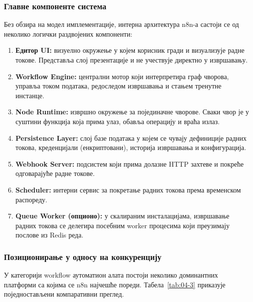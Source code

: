 \subsubsection{Главне компоненте система}

Без обзира на модел имплементације, интерна архитектура n8n-а
састоји се од неколико логички раздвојених компоненти:

\begin{enumerate}
    \item \textbf{Едитор UI:} визуелно окружење у којем корисник
    гради и визуализује радне токове. Представља слој презентације
    и не учествује директно у извршавању.
    \item \textbf{Workflow Engine:} централни мотор који интерпретира
    граф чворова, управља током података, редоследом извршавања
    и стањем тренутне инстанце.
    \item \textbf{Node Runtime:} извршно окружење за појединачне
    чворове. Сваки чвор је у суштини функција која прима улаз,
    обавља операцију и враћа излаз.
    \item \textbf{Persistence Layer:} слој базе података у којем се
    чувају дефиниције радних токова, креденцијали (енкриптовани),
    историја извршавања и конфигурација.
    \item \textbf{Webhook Server:} подсистем који прима долазне HTTP
    захтеве и покреће одговарајуће радне токове.
    \item \textbf{Scheduler:} интерни сервис за покретање радних
    токова према временском распореду.
    \item \textbf{Queue Worker (опционо):} у скалираним инсталацијама,
    извршавање радних токова се делегира посебним worker процесима
    који преузимају послове из Redis реда.
\end{enumerate}

\subsubsection{Позиционирање у односу на конкуренцију}

У категорији workflow аутоматион алата постоји неколико доминантних
платформи са којима се n8n најчешће пореди. Табела~\ref{tab:04-3}
приказује поједностављени компаративни преглед.

